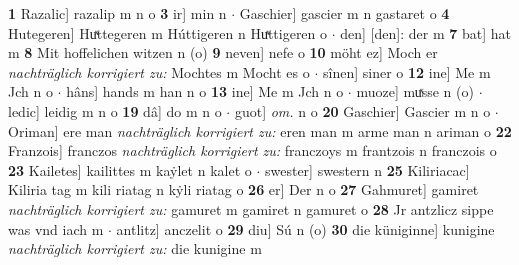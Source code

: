 \documentclass[8pt,a4paper,notitlepage]{article}
\begin{document}
\begin{table}[ht]
\begin{minipage}[t]{0.5\linewidth}
\textbf{1} Razalic] razalip m n o \textbf{3} ir] min n  $\cdot$ Gaschier] gascier m n gastaret o \textbf{4} Hutegeren] Huͯttegeren m Húttigeren n Huͯttigeren o  $\cdot$ den] [den]: der m \textbf{7} bat] hat m \textbf{8} Mit hoffelichen witzen n (o) \textbf{9} neven] nefe o \textbf{10} möht ez] Moch er \textit{nachträglich korrigiert zu:} Mochtes m Mocht es o  $\cdot$ sînen] siner o \textbf{12} ine] Me m Jch n o  $\cdot$ hâns] hands m han n o \textbf{13} ine] Me m Jch n o  $\cdot$ muoze] muͯsse n (o)  $\cdot$ ledic] leidig m n o \textbf{19} dâ] do m n o  $\cdot$ guot] \textit{om.} n o \textbf{20} Gaschier] Gascier m n o  $\cdot$ Oriman] ere man \textit{nachträglich korrigiert zu:} eren man m arme man n ariman o \textbf{22} Franzois] franczos \textit{nachträglich korrigiert zu:} franczoys m frantzois n franczois o \textbf{23} Kailetes] kailittes m kaẏlet n kalet o  $\cdot$ swester] swestern n \textbf{25} Kiliriacac] Kiliria tag m kili riatag n kẏli riatag o \textbf{26} er] Der n o \textbf{27} Gahmuret] gamiret \textit{nachträglich korrigiert zu:} gamuret m gamiret n gamuret o \textbf{28} Jr antzlicz sippe was vnd iach m  $\cdot$ antlitz] anczelit o \textbf{29} diu] Sú n (o) \textbf{30} die küniginne] kunigine \textit{nachträglich korrigiert zu:} die kunigine m \newline
\end{minipage}
\end{table}
\newpage
\end{document}
